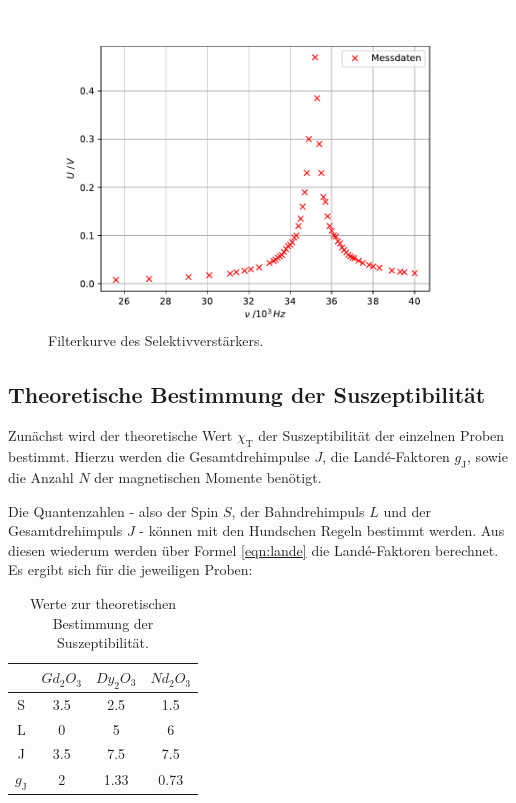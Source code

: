 \begin{figure}[h!tbp]
	\centering
	\includegraphics[width=0.9\linewidth]{selektiv.pdf}
	\caption{Filterkurve des Selektivverstärkers.}
	\label{fig:selektiv}
\end{figure}

\newpage
\subsection{Theoretische Bestimmung der Suszeptibilität}
Zunächst wird der theoretische Wert $\chi_{\text{T}}$ der Suszeptibilität der einzelnen Proben bestimmt. Hierzu werden die Gesamtdrehimpulse $J$, die Landé-Faktoren $g_{\text{J}}$, sowie die Anzahl $N$ der magnetischen Momente benötigt.

Die Quantenzahlen - also der Spin $S$, der Bahndrehimpuls $L$ und der Gesamtdrehimpuls $J$ - können mit den Hundschen Regeln bestimmt werden. Aus diesen wiederum werden über Formel \ref{eqn:lande} die Landé-Faktoren berechnet.
Es ergibt sich für die jeweiligen Proben:

\begin{table}[htbp]
\centering
\caption{Werte zur theoretischen Bestimmung der Suszeptibilität.}
\label{tab:some_data}
\begin{tabular}{S[table-auto-round, table-format=1] S[table-auto-round, table-format=1.2] S S}
\toprule
 & {$Gd_2O_3 $} & {$Dy_2O_3$} & {$Nd_2O_3$} \\
\midrule
S & 3.5 & 2.5 & 1.5 \\
L & 0   & 5   & 6  \\
J & 3.5 & 7.5 & 7.5  \\
$g_{\text{J}}$ & 2 & 1.33 & 0.73 \\
\bottomrule
\end{tabular}
\end{table}

